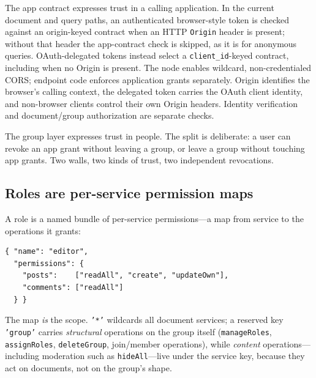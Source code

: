 \documentclass[sigconf, nonacm]{acmart}
\begin{document}
\begin{center}
\small
{}
\end{center}

The app contract expresses trust in a calling application. In the current
document and query paths, an authenticated browser-style token is checked
against an origin-keyed contract when an HTTP \texttt{Origin} header is
present; without that header the app-contract check is skipped, as it is for
anonymous queries. OAuth-delegated tokens instead select a
\texttt{client\_id}-keyed contract, including when no Origin is present. The
node enables wildcard, non-credentialed CORS; endpoint code enforces
application grants separately. Origin identifies the browser's calling
context, the delegated token carries the OAuth client identity, and
non-browser clients control their own Origin headers. Identity verification
and document/group authorization are separate checks.

The group layer expresses trust in people. The split is deliberate: a user
can revoke an app grant without leaving a group, or leave a group without
touching app grants. Two walls, two kinds of trust, two independent
revocations.

\subsection{Roles are per-service permission maps}

A role is a named bundle of per-service permissions---a map from service to
the operations it grants:

\begin{lstlisting}[style=json]
{ "name": "editor",
  "permissions": {
    "posts":    ["readAll", "create", "updateOwn"],
    "comments": ["readAll"]
  } }
\end{lstlisting}

The map \emph{is} the scope. \texttt{'*'} wildcards all document services; a
reserved key \texttt{'group'} carries \emph{structural} operations on the
group itself (\texttt{manageRoles}, \texttt{assignRoles},
\texttt{deleteGroup}, join/member operations), while \emph{content}
operations---including moderation such as \texttt{hideAll}---live under the
service key, because they act on documents, not on the group's shape.
\end{document}

